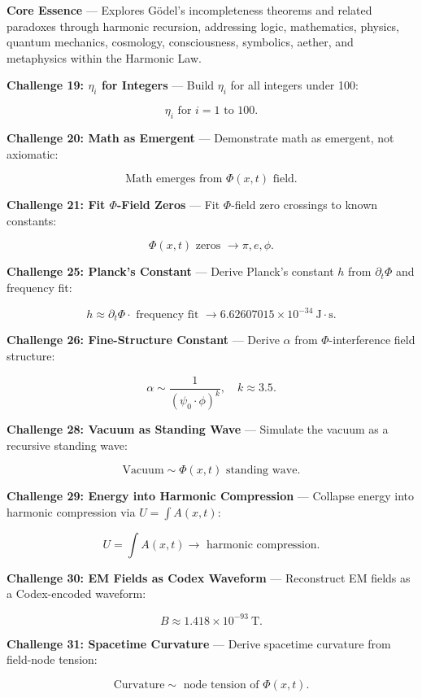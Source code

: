 
\textbf{Core Essence} --- Explores Gödel's incompleteness theorems and related paradoxes through harmonic recursion, addressing logic, mathematics, physics, quantum mechanics, cosmology, consciousness, symbolics, aether, and metaphysics within the Harmonic Law.

\textbf{Challenge 19: $\eta_i$ for Integers} --- Build $\eta_i$ for all integers under 100:

$$
\eta_i \text{ for } i = 1 \text{ to } 100.
$$

\textbf{Challenge 20: Math as Emergent} --- Demonstrate math as emergent, not axiomatic:

$$
\text{Math emerges from } \Phi(x, t) \text{ field}.
$$

\textbf{Challenge 21: Fit $\Phi$-Field Zeros} --- Fit $\Phi$-field zero crossings to known constants:

$$
\Phi(x, t) \text{ zeros } \rightarrow \pi, e, \phi.
$$

\textbf{Challenge 25: Planck's Constant} --- Derive Planck's constant $h$ from $\partial_t \Phi$ and frequency fit:

$$
h \approx \partial_t \Phi \cdot \text{ frequency fit } \rightarrow 6.62607015 \times 10^{-34} \mathrm{~J} \cdot \mathrm{s}.
$$

\textbf{Challenge 26: Fine-Structure Constant} --- Derive $\alpha$ from $\Phi$-interference field structure:

$$
\alpha \sim \frac{1}{\left(\psi_0 \cdot \phi\right)^k}, \quad k \approx 3.5.
$$

\textbf{Challenge 28: Vacuum as Standing Wave} --- Simulate the vacuum as a recursive standing wave:

$$
\text{Vacuum} \sim \Phi(x, t) \text{ standing wave}.
$$

\textbf{Challenge 29: Energy into Harmonic Compression} --- Collapse energy into harmonic compression via $U = \int A(x, t)$:

$$
U = \int A(x, t) \rightarrow \text{ harmonic compression}.
$$

\textbf{Challenge 30: EM Fields as Codex Waveform} --- Reconstruct EM fields as a Codex-encoded waveform:

$$
B \approx 1.418 \times 10^{-93} \mathrm{~T}.
$$

\textbf{Challenge 31: Spacetime Curvature} --- Derive spacetime curvature from field-node tension:

$$
\text{Curvature} \sim \text{ node tension of } \Phi(x, t).
$$

